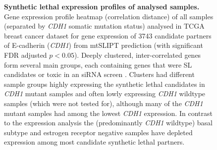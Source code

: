 \begin{figure}[!ht]
  \centering
    \caption[Synthetic lethal expression profiles of analysed samples]{\small \textbf{Synthetic lethal expression profiles of analysed samples.} Gene expression profile heatmap (correlation distance) of all samples (separated by \textit{CDH1} somatic mutation status) analysed in \gls{TCGA} breast cancer dataset for gene expression of 3743 candidate partners of \gls{E-cadherin} (\textit{CDH1}) from \acrshort{mtSLIPT} prediction (with significant \gls{FDR} adjusted $p < 0.05$). Deeply clustered, inter-correlated genes form several main groups, each containing genes that were SL candidates or toxic in an \gls{siRNA} screen \cite{Telford2015}. Clusters had different sample groups highly expressing the synthetic lethal candidates in \textit{CDH1} mutant samples and often lowly expressing \textit{CDH1} wildtype samples (which were not tested for), although many of the \textit{CDH1} mutant samples had among the lowest \textit{CDH1} expression. In contrast to the expression analysis the (predominantly \textit{CDH1} wildtype) basal subtype and estrogen receptor negative samples have depleted expression among most candidate synthetic lethal partners. 
}
\label{fig:slipt_expr_mtSL}
\end{figure}

